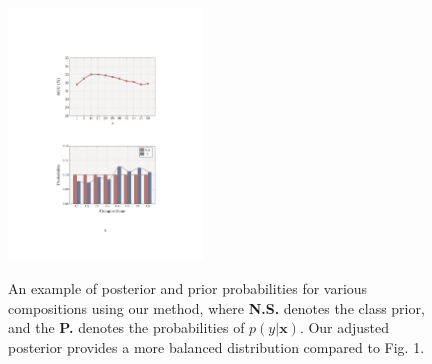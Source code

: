 \documentclass[letterpaper]{article} %
\newcommand{\mx}{\mathbf{x}}
\theoremstyle{definition}
\begin{document}
 	\begin{table}[t]
		\centering
        	\vspace{-2ex}
		\caption{Ablation results for different inference method. \textit{sp} $=0$ denotes we set the seen attribute prior in Eq. 16 to 0. And $\lambda \rightarrow \infty$ denotes we remove the probability from Importance Sampling. $\checkmark$ indicates true, and $\times$ indicates false. }
		\label{subtab.ablation3}
	\end{table}

 \begin{figure}[t]
	\centering
		\subfigure
		{
			\includegraphics[width=0.46\textwidth]{ sub_fig1.pdf}
		}

	\caption{An example of posterior and prior probabilities for various compositions using our method, where \textbf{N.S.} denotes the class prior, and the \textbf{P.} denotes the probabilities of $p(y|\mx)$. Our adjusted posterior provides a more balanced distribution compared to Fig. 1.}
	\label{sub_figre_ana}
\end{figure}
\end{document}
